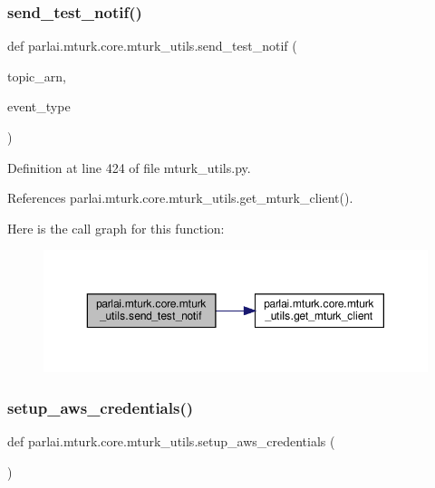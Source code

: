 \subsubsection{\texorpdfstring{send\+\_\+test\+\_\+notif()}{send\_test\_notif()}}
{\footnotesize\ttfamily def parlai.\+mturk.\+core.\+mturk\+\_\+utils.\+send\+\_\+test\+\_\+notif (\begin{DoxyParamCaption}\item[{}]{topic\+\_\+arn,  }\item[{}]{event\+\_\+type }\end{DoxyParamCaption})}



Definition at line 424 of file mturk\+\_\+utils.\+py.



References parlai.\+mturk.\+core.\+mturk\+\_\+utils.\+get\+\_\+mturk\+\_\+client().

Here is the call graph for this function\+:
\nopagebreak
\begin{figure}[H]
\begin{center}
\leavevmode
\includegraphics[width=350pt]{namespaceparlai_1_1mturk_1_1core_1_1mturk__utils_a03b8f25675cb76e8b27205ca5d26e623_cgraph}
\end{center}
\end{figure}
\mbox{\label{namespaceparlai_1_1mturk_1_1core_1_1mturk__utils_a018a49fdf2cf6ff4c0b279d2f5b1bff0}} 
\subsubsection{\texorpdfstring{setup\+\_\+aws\+\_\+credentials()}{setup\_aws\_credentials()}}
{\footnotesize\ttfamily def parlai.\+mturk.\+core.\+mturk\+\_\+utils.\+setup\+\_\+aws\+\_\+credentials (\begin{DoxyParamCaption}{ }\end{DoxyParamCaption})}



